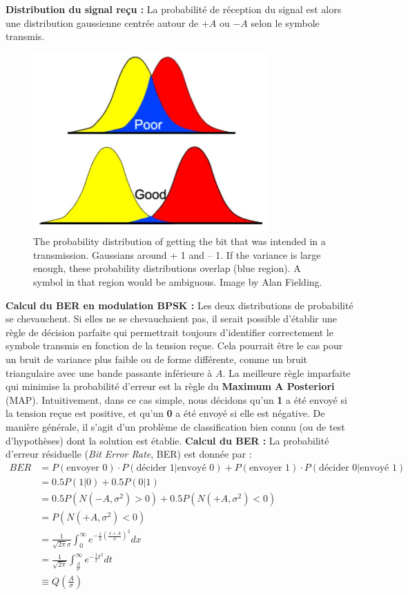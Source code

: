 \textbf{Distribution du signal reçu :}
La probabilité de réception du signal est alors une distribution gaussienne centrée autour de $+A$ ou $-A$ selon le symbole transmis.
\begin{figure}[H] %
    \centering
    \includegraphics[width=0.8\textwidth]{figures/6-49.jpg}
    \caption{The probability distribution of getting the bit that was intended in a transmission. Gaussians around + 1 and – 1. If the variance is large enough, these probability distributions overlap (blue region). A symbol in that region would be ambiguous. Image by Alan Fielding.}
    \label{fig:communication2}
\end{figure}
\textbf{Calcul du BER en modulation BPSK :}
Les deux distributions de probabilité se chevauchent. Si elles ne se chevauchaient pas, il serait possible d’établir une règle de décision parfaite qui permettrait toujours d’identifier correctement le symbole transmis en fonction de la tension reçue. Cela pourrait être le cas pour un bruit de variance plus faible ou de forme différente, comme un bruit triangulaire avec une bande passante inférieure à $A$.
La meilleure règle imparfaite qui minimise la probabilité d'erreur est la règle du \textbf{Maximum A Posteriori} (MAP). Intuitivement, dans ce cas simple, nous décidons qu'un \textbf{1} a été envoyé si la tension reçue est positive, et qu’un \textbf{0} a été envoyé si elle est négative. De manière générale, il s'agit d'un problème de classification bien connu (ou de test d'hypothèses) dont la solution est établie.
\textbf{Calcul du BER :}
La probabilité d’erreur résiduelle (\textit{Bit Error Rate}, BER) est donnée par :
\begin{align*} 
BER &= P(\text{envoyer } 0) \cdot P(\text{décider } 1 | \text{envoyé } 0 ) + P(\text{envoyer } 1) \cdot P(\text{décider } 0 | \text{envoyé } 1) \\ 
&= 0.5 P(1|0) + 0.5 P(0|1) \\ 
&= 0.5 P (N( - A,\sigma^2)>0) + 0.5 P (N( + A,\sigma^2)<0) \\ 
&= P (N( + A,\sigma^2)<0) \\ 
&= \frac{1}{\sqrt{2\pi} \sigma} \int_0^\infty e^{-\frac{1}{2} \left(\frac{x+A}{\sigma}\right)^2} dx \\ 
&= \frac{1}{\sqrt{2\pi}} \int_{\frac{A}{\sigma}}^\infty e^{-\frac{1}{2} t^2} dt \\ 
&\equiv Q \left( \frac{A}{\sigma} \right)
\end{align*}
